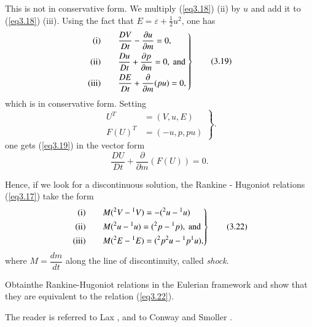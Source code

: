 This is not in conservative form. We multiply (\ref{eq3.18}) (ii) by $u$ and
add it to (\ref{eq3.18}) (iii). Using the fact that $E = \varepsilon +
\frac{1}{2} u^2$, one has 
\begin{equation*}
\left. 
\begin{aligned}
{\rm (i)} \qquad & \frac{D V}{Dt} - \frac{\partial u}{\partial m} = 0,\\
{\rm (ii)} \qquad & \frac{D u}{Dt} + \frac{\partial p}{\partial m} = 0,
\text{ and }\\
{\rm (iii)} \qquad & \frac{D E}{D t}+  \frac{\partial}{\partial m} (pu)  =0,
\end{aligned}
\right\}
\tag{3.19} \label{eq3.19}
\end{equation*}
which is in conservative form. Setting
\begin{equation*}
\left. 
\begin{aligned}
U^T & = (V,u, E)\\
F(U)^T & = (-u, p, pu)
\end{aligned}
\right\}.
\tag{3.20}\label{eq3.20}
\end{equation*}
one gets (\ref{eq3.19}) in the vector form 
\begin{equation*}
\frac{DU}{Dt} + \frac{\partial}{\partial m} (F(U)) = 0.
\tag{3.21}\label{eq3.21}
\end{equation*}

Hence, if we look for a discontinuous solution, the Rankine - Hugoniot
relations (\ref{eq3.17}) take the form
\begin{equation*}
\left. 
\begin{aligned}
{\rm (i)} \qquad &  M({}^2 V - {}^1 V) = - ({}^2u - {}^1 u)\\
{\rm (ii)} \qquad & M({}^2 u - {}^1 u) = ({}^2 p - {}^1 p), \text{ and
}\\
{\rm (iii)} \qquad & M({}^2 E - {}^1 E) = ({}^2 p {}^2 u - {}^1 p {}^1
u), 
\end{aligned}
\right\}
\tag{3.22}\label{eq3.22}
\end{equation*}
where $M = \dfrac{dm}{dt}$ along the line of discontinuity, called
{\em shock}. 


\begin{exercise}\label{chap3:exer3.2}
Obtain\pageoriginale the Rankine-Hugoniot relations in the Eulerian
framework and show that they  are equivalent to the relation (\ref{eq3.22}).
\end{exercise}


\medskip
{} The reader is referred to Lax
\cite{key21},\cite{key22} and to Conway and Smoller \cite{key8}. 
